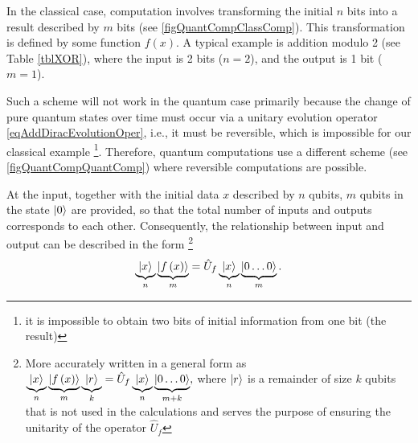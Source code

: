 

In the classical case, computation involves transforming the initial $n$ bits into a result described by $m$ bits (see \autoref{figQuantCompClassComp}). This transformation is defined by some function $f\left(x\right)$. A typical example is addition modulo 2 (see Table \ref{tblXOR}), where the input is 2 bits ($n = 2$), and the output is 1 bit ($m = 1$).



Such a scheme will not work in the quantum case primarily because the change of pure quantum states over time must occur via a unitary evolution operator \eqref{eqAddDiracEvolutionOper}, i.e., it must be reversible, which is impossible for our classical example \footnote{it is impossible to obtain two bits of initial information from one bit (the result)}. Therefore, quantum computations use a different scheme (see \autoref{figQuantCompQuantComp}) where reversible computations are possible.

At the input, together with the initial data $x$ described by $n$ qubits, $m$ qubits in the state $\ket{0}$ are provided, so that the total number of inputs and outputs corresponds to each other. Consequently, the relationship between input and output can be described in the form
\footnote{More accurately written in a general form as 
$
\underbrace{\ket{x}}_n
\underbrace{\left|f\left(x\right)\right>}_m
\underbrace{\ket{r}}_k = 
\hat{U}_f \underbrace{\ket{x}}_n
\underbrace{\left|0 \dots 0\right>}_{m+k},
$
where $\ket{r}$ is a remainder of size $k$ qubits that is not used in the calculations and serves the purpose of ensuring the unitarity of the operator $\hat{U}_f$
}
\begin{equation}
\underbrace{\ket{x}}_n
\underbrace{\left|f\left(x\right)\right>}_m = 
\hat{U}_f \underbrace{\ket{x}}_n\underbrace{\left|0 \dots 0\right>}_m.
\label{eqQuantCompQuantComp}
\end{equation}